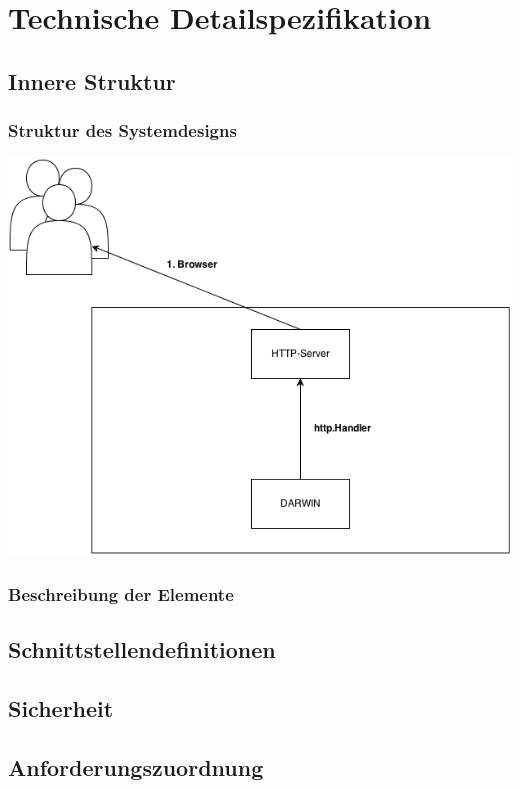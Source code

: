 \section{Technische Detailspezifikation}
\subsection{Innere Struktur}
\subsubsection{Struktur des Systemdesigns}
\includegraphics[width=\linewidth]{simplearch.png}
\subsubsection{Beschreibung der Elemente}
\subsection{Schnittstellendefinitionen}
\subsection{Sicherheit}
\subsection{Anforderungszuordnung}

